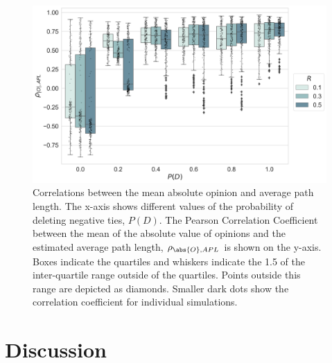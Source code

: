 \documentclass[11pt]{article}
\DeclarePairedDelimiter{\abs}\lvert\rvert
\begin{document}
\begin{figure}[H]
    \centering
    \includegraphics[width=.99\linewidth]{../plots/overall/Tie_Dissolution_Correlations_Boxplot_Full.png}
  \caption{Correlations between the mean absolute opinion and average path length. The x-axis shows different values of the probability of deleting negative ties, $P(D)$. The Pearson Correlation Coefficient between the mean of the absolute value of opinions and the estimated average path length, $\rho_{\abs{O}, APL}$ is shown on the y-axis. Boxes indicate the quartiles and whiskers indicate the 1.5 of the inter-quartile range outside of the quartiles. Points outside this range are depicted as diamonds. Smaller dark dots show the correlation coefficient for individual simulations.}
  \label{fig:corr_abs_path}
\end{figure}

\section{Discussion}
\end{document}
